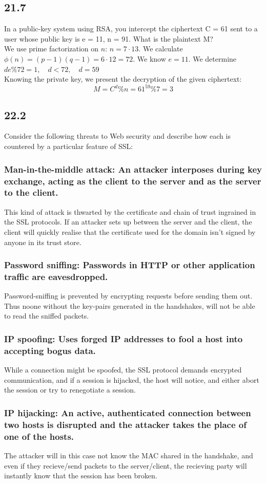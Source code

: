 \documentclass{article}
\begin{document}
\subsection{21.7}
In a public-key system using RSA, you intercept the ciphertext C = 61 sent to a user
whose public key is e = 11, n = 91. What is the plaintext M?\\
We use prime factorization on $n$: $n = 7\cdot 13$. We calculate
$\phi (n) = (p-1)(q-1) = 6 \cdot 12 = 72$. We know $e = 11$. We determine
$de \% 72 = 1,\quad d < 72,\quad d = 59$\\
Knowing the private key, we present the decryption of the given ciphertext:
\[
    M = C^d \% n = 61^59 \% 7 = 3
\]


\subsection{22.2}
Consider the following threats to Web security and describe how each is countered by
a particular feature of SSL:
\subsubsection{Man-in-the-middle attack: An attacker interposes during key exchange,
acting as the client to the server and as the server to the client.}
This kind of attack is thwarted by the certificate and chain of trust ingrained in
the SSL protocols. If an attacker sets up between the server and the client, the
client will quickly realise that the certificate used for the domain isn't signed
by anyone in its trust store.
\subsubsection{Password sniffing: Passwords in HTTP or other application traffic are 
eavesdropped.}
Password-sniffing is prevented by encrypting requests before sending them out. Thus
noone without the key-pairs generated in the handshakes, will not be able to read
the sniffed packets.
\subsubsection{IP spoofing: Uses forged IP addresses to fool a host into accepting bogus 
data.}
While a connection might be spoofed, the SSL protocol demands encrypted communication,
and if a session is hijacked, the host will notice, and either abort the session or
try to renegotiate a session.
\subsubsection{IP hijacking: An active, authenticated connection between two hosts is 
disrupted and the attacker takes the place of one of the hosts.}
The attacker will in this case not know the MAC shared in the handshake, and even
if they recieve/send packets to the server/client, the recieving party will instantly
know that the session has been broken.
\end{document}
